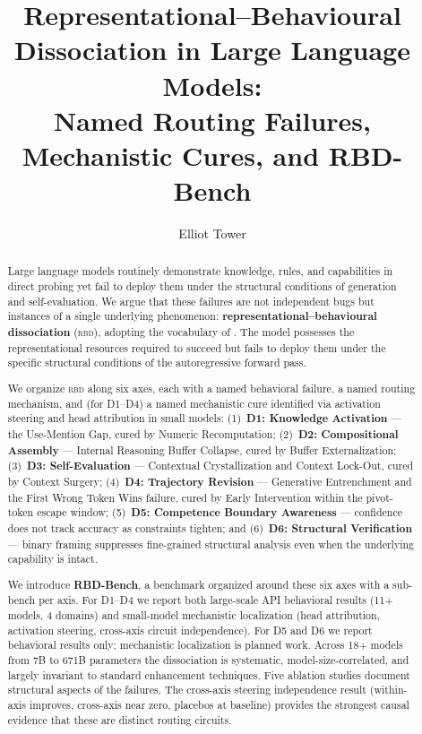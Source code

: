 \documentclass[11pt]{article}
\title{Representational--Behavioural Dissociation in Large Language Models:\\
Named Routing Failures, Mechanistic Cures, and RBD-Bench}
\author{Elliot Tower}
\newcommand{\rbd}{\textsc{rbd}}
\newcommand{\umg}{Use-Mention Gap}
\newcommand{\irb}{Internal Reasoning Buffer}
\newcommand{\cc}{Contextual Crystallization}
\newcommand{\Gesup}{Generative Entrenchment}
\begin{document}
\maketitle

\begin{abstract}
Large language models routinely demonstrate knowledge, rules, and
capabilities in direct probing yet fail to deploy them under the
structural conditions of generation and self-evaluation. We argue that
these failures are not independent bugs but instances of a single
underlying phenomenon: \textbf{representational--behavioural
dissociation} (\rbd{}), adopting the vocabulary of
\citet{vegner2025systematicity}. The model possesses the representational
resources required to succeed but fails to deploy them under the specific
structural conditions of the autoregressive forward pass.

We organize \rbd{} along six axes, each with a named behavioral
failure, a named routing mechanism, and (for D1--D4) a named mechanistic
cure identified via activation steering and head attribution in
small models: (1)~\textbf{D1: Knowledge Activation} --- the
\umg{}, cured by Numeric Recomputation; (2)~\textbf{D2: Compositional
Assembly} --- \irb{} Collapse, cured by Buffer Externalization;
(3)~\textbf{D3: Self-Evaluation} --- \cc{} and Context Lock-Out,
cured by Context Surgery; (4)~\textbf{D4: Trajectory Revision} ---
\Gesup{} and the First Wrong Token Wins failure, cured by Early
Intervention within the pivot-token escape window; (5)~\textbf{D5:
Competence Boundary Awareness} --- confidence does not track accuracy
as constraints tighten; and (6)~\textbf{D6: Structural Verification}
--- binary framing suppresses fine-grained structural analysis even when
the underlying capability is intact.

We introduce \textbf{RBD-Bench}, a benchmark organized around these six
axes with a sub-bench per axis. For D1--D4 we report both large-scale
API behavioral results (11+ models, 4 domains) and small-model
mechanistic localization (head attribution, activation steering,
cross-axis circuit independence). For D5 and D6 we report behavioral
results only; mechanistic localization is planned work. Across 18+
models from 7B to 671B parameters the dissociation is systematic,
model-size-correlated, and largely invariant to standard enhancement
techniques. Five ablation studies document structural aspects of the
failures. The cross-axis steering independence result (within-axis
improves, cross-axis near zero, placebos at baseline) provides the
strongest causal evidence that these are distinct routing circuits.
\end{abstract}
\end{document}
